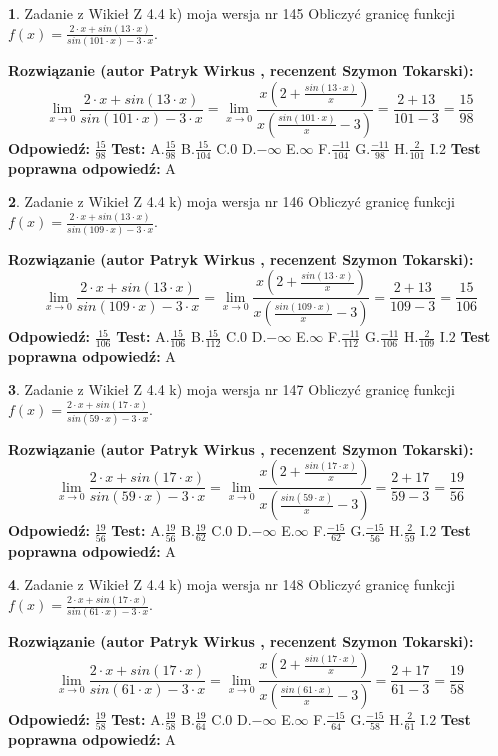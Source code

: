 \documentclass[12pt, a4paper]{article}
\theoremstyle{definition} %
\newtheorem{zad}{}
\newcommand{\zadStart}[1]{\begin{zad}#1\newline}
\newcommand{\zadStop}{\end{zad}}
\newcommand{\rozwStart}[2]{\noindent \textbf{Rozwiązanie (autor #1 , recenzent #2): }\newline}
\newcommand{\rozwStop}{\newline}
\newcommand{\odpStart}{\noindent \textbf{Odpowiedź:}\newline}
\newcommand{\odpStop}{\newline}
\newcommand{\testStart}{\noindent \textbf{Test:}\newline}
\newcommand{\testStop}{\newline}
\newcommand{\kluczStart}{\noindent \textbf{Test poprawna odpowiedź:}\newline}
\newcommand{\kluczStop}{\newline}
\begin{document}
\zadStart{Zadanie z Wikieł Z 4.4 k) moja wersja nr 145}
Obliczyć granicę funkcji $f(x)=\frac{2\cdot x +sin(13\cdot x)}{sin(101\cdot x) -3\cdot x}$.
\zadStop
\rozwStart{Patryk Wirkus}{Szymon Tokarski}
$$\lim\limits_{x\to 0}\frac{2\cdot x +sin(13\cdot x)}{sin(101\cdot x) -3\cdot x}
=\lim\limits_{x\to 0}\frac{x(2+\frac{sin(13\cdot x)}{x})}{x(\frac{sin(101\cdot x)}{x}-3)}
=\frac{2+13}{101-3} = \frac{15}{98}$$
\rozwStop
\odpStart
$\frac{15}{98}$
\odpStop
\testStart
A.$\frac{15}{98}$
B.$\frac{15}{104}$
C.$0$
D.$-\infty$
E.$\infty$
F.$\frac{-11}{104}$
G.$\frac{-11}{98}$
H.$\frac{2}{101}$
I.$2$
\testStop
\kluczStart
A
\kluczStop



\zadStart{Zadanie z Wikieł Z 4.4 k) moja wersja nr 146}
Obliczyć granicę funkcji $f(x)=\frac{2\cdot x +sin(13\cdot x)}{sin(109\cdot x) -3\cdot x}$.
\zadStop
\rozwStart{Patryk Wirkus}{Szymon Tokarski}
$$\lim\limits_{x\to 0}\frac{2\cdot x +sin(13\cdot x)}{sin(109\cdot x) -3\cdot x}
=\lim\limits_{x\to 0}\frac{x(2+\frac{sin(13\cdot x)}{x})}{x(\frac{sin(109\cdot x)}{x}-3)}
=\frac{2+13}{109-3} = \frac{15}{106}$$
\rozwStop
\odpStart
$\frac{15}{106}$
\odpStop
\testStart
A.$\frac{15}{106}$
B.$\frac{15}{112}$
C.$0$
D.$-\infty$
E.$\infty$
F.$\frac{-11}{112}$
G.$\frac{-11}{106}$
H.$\frac{2}{109}$
I.$2$
\testStop
\kluczStart
A
\kluczStop



\zadStart{Zadanie z Wikieł Z 4.4 k) moja wersja nr 147}
Obliczyć granicę funkcji $f(x)=\frac{2\cdot x +sin(17\cdot x)}{sin(59\cdot x) -3\cdot x}$.
\zadStop
\rozwStart{Patryk Wirkus}{Szymon Tokarski}
$$\lim\limits_{x\to 0}\frac{2\cdot x +sin(17\cdot x)}{sin(59\cdot x) -3\cdot x}
=\lim\limits_{x\to 0}\frac{x(2+\frac{sin(17\cdot x)}{x})}{x(\frac{sin(59\cdot x)}{x}-3)}
=\frac{2+17}{59-3} = \frac{19}{56}$$
\rozwStop
\odpStart
$\frac{19}{56}$
\odpStop
\testStart
A.$\frac{19}{56}$
B.$\frac{19}{62}$
C.$0$
D.$-\infty$
E.$\infty$
F.$\frac{-15}{62}$
G.$\frac{-15}{56}$
H.$\frac{2}{59}$
I.$2$
\testStop
\kluczStart
A
\kluczStop



\zadStart{Zadanie z Wikieł Z 4.4 k) moja wersja nr 148}
Obliczyć granicę funkcji $f(x)=\frac{2\cdot x +sin(17\cdot x)}{sin(61\cdot x) -3\cdot x}$.
\zadStop
\rozwStart{Patryk Wirkus}{Szymon Tokarski}
$$\lim\limits_{x\to 0}\frac{2\cdot x +sin(17\cdot x)}{sin(61\cdot x) -3\cdot x}
=\lim\limits_{x\to 0}\frac{x(2+\frac{sin(17\cdot x)}{x})}{x(\frac{sin(61\cdot x)}{x}-3)}
=\frac{2+17}{61-3} = \frac{19}{58}$$
\rozwStop
\odpStart
$\frac{19}{58}$
\odpStop
\testStart
A.$\frac{19}{58}$
B.$\frac{19}{64}$
C.$0$
D.$-\infty$
E.$\infty$
F.$\frac{-15}{64}$
G.$\frac{-15}{58}$
H.$\frac{2}{61}$
I.$2$
\testStop
\kluczStart
A
\kluczStop
\end{document}
